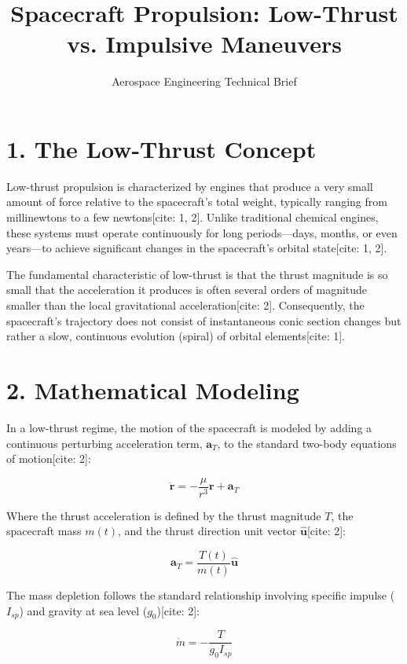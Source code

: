 \documentclass[11pt, a4paper]{article}
\title{\textbf{Spacecraft Propulsion: Low-Thrust vs. Impulsive Maneuvers}}
\author{Aerospace Engineering Technical Brief}
\date{}
\begin{document}
\maketitle

\section{1. The Low-Thrust Concept}
Low-thrust propulsion is characterized by engines that produce a very small amount of force relative to the spacecraft's total weight, typically ranging from millinewtons to a few newtons[cite: 1, 2]. Unlike traditional chemical engines, these systems must operate continuously for long periods—days, months, or even years—to achieve significant changes in the spacecraft's orbital state[cite: 1, 2].

The fundamental characteristic of low-thrust is that the thrust magnitude is so small that the acceleration it produces is often several orders of magnitude smaller than the local gravitational acceleration[cite: 2]. Consequently, the spacecraft's trajectory does not consist of instantaneous conic section changes but rather a slow, continuous evolution (spiral) of orbital elements[cite: 1].

\section{2. Mathematical Modeling}
In a low-thrust regime, the motion of the spacecraft is modeled by adding a continuous perturbing acceleration term, $\mathbf{a}_T$, to the standard two-body equations of motion[cite: 2]:

\begin{equation}
\ddot{\mathbf{r}} = -\frac{\mu}{r^3}\mathbf{r} + \mathbf{a}_T
\end{equation}

Where the thrust acceleration is defined by the thrust magnitude $T$, the spacecraft mass $m(t)$, and the thrust direction unit vector $\hat{\mathbf{u}}$[cite: 2]:

\begin{equation}
\mathbf{a}_T = \frac{T(t)}{m(t)}\hat{\mathbf{u}}
\end{equation}

The mass depletion follows the standard relationship involving specific impulse ($I_{sp}$) and gravity at sea level ($g_0$)[cite: 2]:

\begin{equation}
\dot{m} = -\frac{T}{g_0 I_{sp}}
\end{equation}
\end{document}
